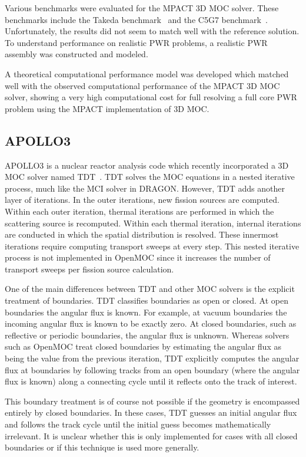 Various benchmarks were evaluated for the MPACT 3D \ac{MOC} solver. These benchmarks include the Takeda benchmark~\cite{takeda} and the C5G7 benchmark~\cite{c5g7}. Unfortunately, the results did not seem to match well with the reference solution. To understand performance on realistic \ac{PWR} problems, a realistic \ac{PWR} assembly was constructed and modeled. 

A theoretical computational performance model was developed which matched well with the observed computational performance of the MPACT 3D \ac{MOC} solver, showing a very high computational cost for full resolving a full core \ac{PWR} problem using the MPACT implementation of 3D \ac{MOC}.

\subsection{APOLLO3}
\label{sec:apollo3}

APOLLO3 is a nuclear reactor analysis code which recently incorporated a 3D \ac{MOC} solver named TDT~\cite{Sciannandrone2016}. TDT solves the \ac{MOC} equations in a nested iterative process, much like the MCI solver in DRAGON. However, TDT adds another layer of iterations. In the outer iterations, new fission sources are computed. Within each outer iteration, thermal iterations are performed in which the scattering source is recomputed. Within each thermal iteration, internal iterations are conducted in which the spatial distribution is resolved. These innermost iterations require computing transport sweeps at every step. This nested iterative process is not implemented in OpenMOC since it increases the number of transport sweeps per fission source calculation. 

One of the main differences between TDT and other \ac{MOC} solvers is the explicit treatment of boundaries. TDT classifies boundaries as open or closed. At open boundaries the angular flux is known. For example, at vacuum boundaries the incoming angular flux is known to be exactly zero. At closed boundaries, such as reflective or periodic boundaries, the angular flux is unknown. Whereas solvers such as OpenMOC treat closed boundaries by estimating the angular flux as being the value from the previous iteration, TDT explicitly computes the angular flux at boundaries by following tracks from an open boundary (where the angular flux is known) along a connecting cycle until it reflects onto the track of interest.

This boundary treatment is of course not possible if the geometry is encompassed entirely by closed boundaries. In these cases, TDT guesses an initial angular flux and follows the track cycle until the initial guess becomes mathematically irrelevant. It is unclear whether this is only implemented for cases with all closed boundaries or if this technique is used more generally.

